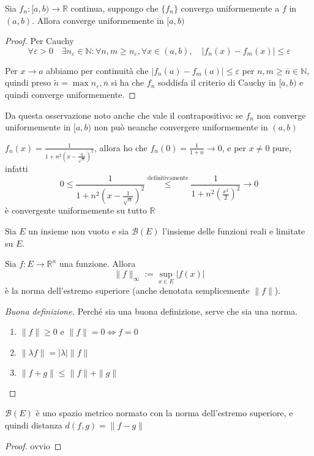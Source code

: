 \begin{remark}
    Sia \(f_{n}: [a, b) \to  \mathbb{R}\) continua, suppongo che \(\{f_{n}\} \)
    converga uniformemente a \(f\) in \((a, b)\). Allora converge uniformemente
    in \([a, b)\) 
\end{remark}
\begin{proof}
    Per Cauchy
    \[
        \forall \varepsilon > 0 \quad \exists n_\varepsilon \in \mathbb{N} :
        \forall  n, m \ge n_\varepsilon, \forall x \in (a, b), \quad |f_{n}(x) -
        f_{m}(x)| \le \varepsilon
    \]

    Per \(x \to  a\) abbiamo per continuità che \(|f_{n}(a) - f_{m}(a)| \le
    \varepsilon\) per \(n, m \ge \overline{n} \in \mathbb{N}\), quindi preso
    \(\tilde{n} = \max{n_\varepsilon, \overline{n}}\) si ha che \(f_{n}\)
    soddisfa il criterio di Cauchy in \([a, b)\) e quindi converge
    uniformemente.
\end{proof}
Da questa osservazione noto anche che vale il contrapositivo: se \(f_{n}\) non
converge uniformemente in \([a, b)\) non può neanche convergere uniformemente in
\((a, b)\)
\begin{example}
    \(\displaystyle f_{n}(x) = \frac{1}{1 + {n^2 \left( x - \frac{q}{\sqrt{n}}
\right)}^2}\), allora ho che \(\displaystyle f_{n}(0) = \frac{1}{1+n} \to 0\), e
per \(x \neq 0\) pure, infatti
\[
    0 \le \frac{1}{1+ n^2 {\left( x - \frac{1}{\sqrt{n}} \right)}^2}
    \overset{\text{definitivamente}}{\le} \frac{1}{1 + n^2 {\left(
    \frac{x^2}{2} \right) }^2} \to 0
\]
è convergente uniformemente su tutto \(\mathbb{R}\)
\end{example}
Sia \(E\) un insieme non vuoto e sia \(\mathcal{B}(E)\) l'insieme delle funzioni
reali e limitate su \(E\).
\begin{definition}
    Sia \(f : E \to \mathbb{R}^{n}\) una funzione. Allora
    \[
        \|f \|_{\infty} := \sup_{x \in E} |f(x)| 
    \]
    è la norma dell'estremo superiore (anche denotata semplicemente \(\|f\|\)).
\end{definition}
\begin{proof}[Buona definizione]
Perché sia una buona definizione, serve che sia una norma. 
\begin{enumerate}[label = \alph*.]
    \item \(\|f\| \ge 0\) e \(\|f\| = 0 \iff f = 0\)
    \item \(\|\lambda f\| = |\lambda| \|f\|\)
    \item \(\|f + g\| \le \|f\| + \|g\|\)
\end{enumerate}
\end{proof}
\begin{proposition}
    \(\mathcal{B}(E)\) è uno spazio metrico normato con la norma dell'estremo
    superiore, e quindi distanza \(d(f, g) = \|f - g\|\) 
\end{proposition}
\begin{proof}
    ovvio
\end{proof}

